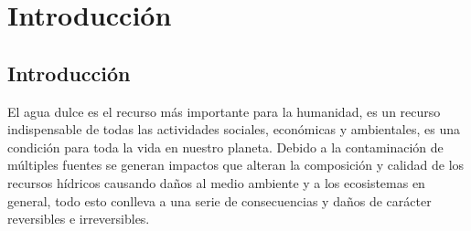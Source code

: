 
\chapter[Capítulo 1. Introducción]{Introducción}
\pagestyle{fancy}

\section{Introducción}

El agua dulce es el recurso más importante para la humanidad, es un recurso indispensable de todas las actividades sociales, económicas y ambientales, es una condición para toda la vida en nuestro planeta.
Debido a la contaminación de múltiples fuentes se generan impactos que alteran la composición y calidad de los recursos hídricos causando daños al medio ambiente y a los ecosistemas en general, todo esto conlleva a una serie de consecuencias y daños de carácter reversibles e irreversibles.

